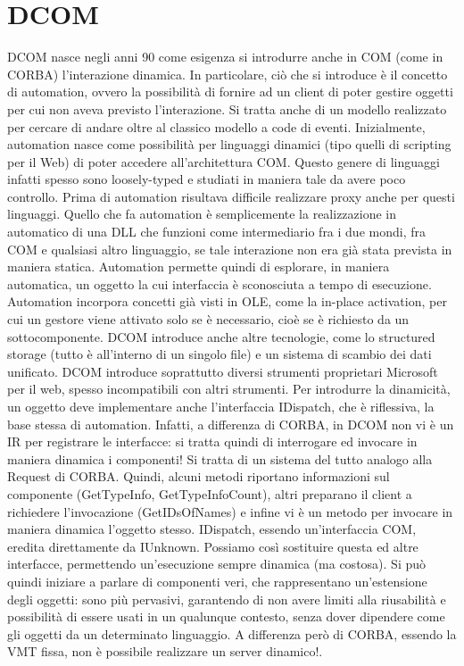 \section{DCOM}
DCOM nasce negli anni 90 come esigenza si introdurre anche in COM (come in CORBA) l'interazione dinamica. In
particolare, ciò che si introduce è il concetto di automation, ovvero la possibilità di fornire ad un client di poter
gestire oggetti per cui non aveva previsto l'interazione. Si tratta anche di un modello realizzato per cercare di andare
oltre al classico modello a code di eventi.
Inizialmente, automation nasce come possibilità per linguaggi dinamici (tipo quelli di scripting per il Web) di poter
accedere all'architettura COM. Questo genere di linguaggi infatti spesso sono loosely-typed e studiati in maniera tale
da avere poco controllo. Prima di automation risultava difficile realizzare proxy anche per questi linguaggi.
Quello che fa automation è semplicemente la realizzazione in automatico di una DLL che funzioni come intermediario fra i
due mondi, fra COM e qualsiasi altro linguaggio, se tale interazione non era già stata prevista in maniera statica.
Automation permette quindi di esplorare, in maniera automatica, un oggetto la cui interfaccia è sconosciuta a tempo di
esecuzione. Automation incorpora concetti già visti in OLE, come la in-place activation, per cui un gestore viene
attivato solo se è necessario, cioè se è richiesto da un sottocomponente. DCOM introduce anche altre tecnologie, come lo
structured storage (tutto è all'interno di un singolo file) e un sistema di scambio dei dati unificato. DCOM introduce
soprattutto diversi strumenti proprietari Microsoft per il web, spesso incompatibili con altri strumenti.
Per introdurre la dinamicità, un oggetto deve implementare anche l'interfaccia IDispatch, che è riflessiva, la base
stessa di automation. Infatti, a differenza di CORBA, in DCOM non vi è un IR per registrare le interfacce: si tratta
quindi di interrogare ed invocare in maniera dinamica i componenti! Si tratta di un sistema del tutto analogo alla
Request di CORBA.
Quindi, alcuni metodi riportano informazioni sul componente (GetTypeInfo, GetTypeInfoCount), altri preparano il client a
richiedere l'invocazione (GetIDsOfNames) e infine vi è un metodo per invocare in maniera dinamica l'oggetto stesso.
IDispatch, essendo un'interfaccia COM, eredita direttamente da IUnknown. Possiamo così sostituire questa ed altre
interfacce, permettendo un'esecuzione sempre dinamica (ma costosa).
Si può quindi iniziare a parlare di componenti veri, che rappresentano un'estensione degli oggetti: sono più pervasivi,
garantendo di non avere limiti alla riusabilità e possibilità di essere usati in un qualunque contesto, senza dover
dipendere come gli oggetti da un determinato linguaggio.
A differenza però di CORBA, essendo la VMT fissa, non è possibile realizzare un server dinamico!.
